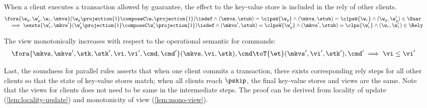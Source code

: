 \begin{lemma}
\label{lem:locality-update}
When a client executes a transaction allowed by guarantee, the effect to the key-value store is included in the rely of other clients.
\[
\begin{array}{@{}l}
    \fora{\w_g, \w_g', \w_r, \mkvs} (\w_g\projection{1} \composeC \w_r\projection{1} )\isdef \land (\mkvs, \stub) = \clpsW{\w_g} \land  (\mkvs, \stub) = \clpsW{\w_r} \land (\w_g, \w_g') \in \Guar  \\
    \quad \implies \exsts{\w_r', \mkvs'} (\w_g'\projection{1} \composeC \w_r'\projection{1})\isdef \land (\mkvs', \stub) = \clpsW{\w_g'} \land  (\mkvs', \stub) = \clps{\w_r'} \land (\w_r, \w_r') \in \Rely 
\end{array} 
\]
\end{lemma}

\begin{lemma}
\label{lem:mono-view}
The view monotonically increases with respect to the operational semantic for commands:
\[
    \begin{array}{@{}l}
        \fora{\mkvs, \mkvs', \stk, \stk', \vi, \vi', \cmd, \cmd'} (\mkvs, \vi, \stk), \cmd \toT{\et} (\mkvs', \vi', \stk'), \cmd' \implies \vi \leq \vi'
    \end{array}
\]
\end{lemma}

Last, the soundness for parallel rules asserts that when one client commits a transaction, there exists corresponding rely steps for all other clients so that the state of key-value stores match; when all clients reach \( \pskip \), the final key-value stores and views are the same.
Note that the views for clients does not need to be same in the intermediate steps.
The proof can be derived from locality of update (\cref{lem:locality-update}) and monotonicity of view (\cref{lem:mono-view}).

